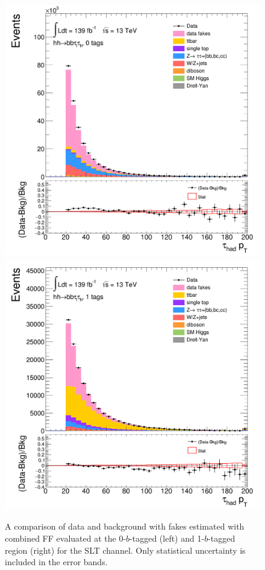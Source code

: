 \begin{figure}[htbp]
\centering
\includegraphics[width=.4\textwidth]{DiHiggs/plots/FF_CRs/SR_SLT_datafakes/HNone/BDTVarsHighMbb/0/C_0tag2pjet_0ptv_TauPt.png}
\includegraphics[width=.4\textwidth]{DiHiggs/plots/FF_CRs/SR_SLT_datafakes/HNone/BDTVarsHighMbb/1/C_1tag2pjet_0ptv_TauPt.png} \\
\caption{A comparison of data and background with fakes estimated with combined FF evaluated at the 0-$b$-tagged (left) 
and 1-$b$-tagged region (right) for the SLT channel.
Only statistical uncertainty is included in the error bands. }
\label{fig:FFVRSLT}
\end{figure}


